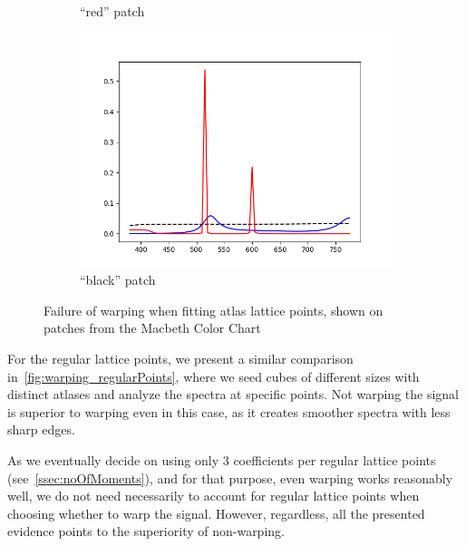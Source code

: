 \begin{figure}[t]
\begin{subfigure}[t]{0.32\textwidth}
	\caption{``red'' patch}
	\label{fig:warping_alp_red}
	\end{subfigure} \hspace{0.1em}
	\begin{subfigure}[t]{0.32\textwidth}
		\includegraphics[width=\linewidth]{img/results_warping_black.png}
		\caption{``black'' patch}
		\label{fig:warping_alp_black}
	\end{subfigure}
	\caption{Failure of warping when fitting atlas lattice points, shown on patches from the Macbeth Color Chart}
	\label{fig:warping_atlasLatticePoints}
\end{figure}

For the regular lattice points, we present a similar comparison in~\cref{fig:warping_regularPoints}, where we seed cubes of different sizes with distinct atlases and analyze the spectra at specific points. Not warping the signal is superior to warping even in this case, as it creates smoother spectra with less sharp edges. 

As we eventually decide on using only 3 coefficients per regular lattice points (see~\cref{ssec:noOfMoments}), and for that purpose, even warping works reasonably well, we do not need necessarily to account for regular lattice points when choosing whether to warp the signal. However, regardless, all the presented evidence points to the superiority of non-warping.

